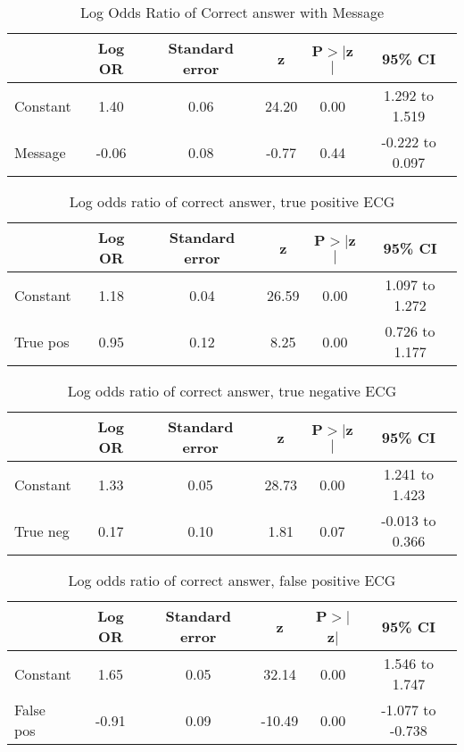 \begin{table}[htbp]
\centering
\caption{Log Odds Ratio of Correct answer with Message} 
\label{lormesg}
\begin{tabular}{lccccc}
  \toprule
 & Log OR & Standard error & z & P$>$$|$z$|$ & 95\% CI \\ 
  \midrule
Constant & 1.40 & 0.06 & 24.20 & 0.00 & 1.292 to 1.519 \\ 
  Message & -0.06 & 0.08 & -0.77 & 0.44 & -0.222 to 0.097 \\ 
   \bottomrule
\end{tabular}
\end{table}
\begin{table}[htbp]
\centering
\caption{Log odds ratio of correct answer, true positive ECG} 
\label{lormesg}
\begin{tabular}{lccccc}
  \toprule
 & Log OR & Standard error & z & P$>$$|$z$|$ & 95\% CI \\ 
  \midrule
Constant & 1.18 & 0.04 & 26.59 & 0.00 & 1.097 to 1.272 \\ 
  True pos & 0.95 & 0.12 & 8.25 & 0.00 & 0.726 to 1.177 \\ 
   \bottomrule
\end{tabular}
\end{table}
\begin{table}[htbp]
\centering
\caption{Log odds ratio of correct answer, true negative ECG} 
\label{lormesg}
\begin{tabular}{lccccc}
  \toprule
 & Log OR & Standard error & z & P$>$$|$z$|$ & 95\% CI \\ 
  \midrule
Constant & 1.33 & 0.05 & 28.73 & 0.00 & 1.241 to 1.423 \\ 
  True neg & 0.17 & 0.10 & 1.81 & 0.07 & -0.013 to 0.366 \\ 
   \bottomrule
\end{tabular}
\end{table}
\begin{table}[htbp]
\centering
\caption{Log odds ratio of correct answer, false positive ECG} 
\label{lormesg}
\begin{tabular}{lccccc}
  \toprule
 & Log OR & Standard error & z & P$>$$|$z$|$ & 95\% CI \\ 
  \midrule
Constant & 1.65 & 0.05 & 32.14 & 0.00 & 1.546 to 1.747 \\ 
  False pos & -0.91 & 0.09 & -10.49 & 0.00 & -1.077 to -0.738 \\ 
   \bottomrule
\end{tabular}
\end{table}
